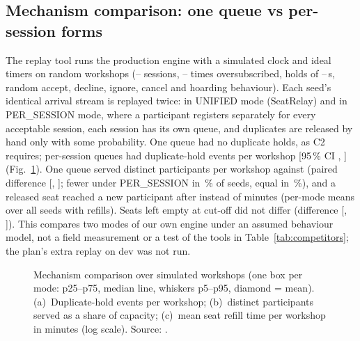 \subsection{Mechanism comparison: one queue vs per-session forms}\label{sec:mechanism}
The replay tool runs the production engine with a simulated clock and ideal timers on
\ReplaySeeds{} random workshops (\ReplayRangeSessionsMin--\ReplayRangeSessionsMax{} sessions,
\ReplayRangeOversubscriptionMin--\ReplayRangeOversubscriptionMax{} times oversubscribed, holds of
\ReplayRangeHoldSecondsMin--\ReplayRangeHoldSecondsMax\,s, random accept, decline, ignore, cancel and
hoarding behaviour). Each seed's identical arrival stream is replayed twice: in UNIFIED mode (SeatRelay) and in
PER\_SESSION mode, where a participant registers separately for every acceptable session, each
session has its own queue, and duplicates are released by hand only with some probability. One queue had
no duplicate holds, as C2 requires; per-session queues had
\ReplayDupHoldEventsPerSessionMean{} duplicate-hold events per workshop
[95\,\% CI \ReplayDupHoldEventsPerSessionLo, \ReplayDupHoldEventsPerSessionHi] (Fig.~\ref{fig:replay}). One
queue served \ReplayDistinctUnifiedMean{} distinct participants per workshop against
\ReplayDistinctPerSessionMean{} (paired difference \ReplayDistinctDeltaMean{}
[\ReplayDistinctDeltaLo, \ReplayDistinctDeltaHi]; fewer under PER\_SESSION in
\ReplayDistinctFewerSeedsPct\,\% of seeds, equal in \ReplayDistinctEqualSeedsPct\,\%), and a released
seat reached a new participant after \ReplayRefillMeanUnifiedMean{} instead of
\ReplayRefillMeanPerSessionMean{} minutes (per-mode means over all seeds with refills). Seats left empty
at cut-off did not differ (difference \ReplaySeatsWastedDeltaMean{}
[\ReplaySeatsWastedDeltaLo, \ReplaySeatsWastedDeltaHi]). This compares two modes of our own engine
under an assumed behaviour model, not a field measurement or a test of the tools in
Table~\ref{tab:competitors}; the plan's extra replay on dev was not run.

\begin{figure}[t]
  \centering{}
  \caption{Mechanism comparison over \ReplaySeeds{} simulated workshops (one box per mode: p25--p75,
  median line, whiskers p5--p95, diamond = mean). (a)~Duplicate-hold events per workshop;
  (b)~distinct participants served as a share of capacity; (c)~mean seat refill time per workshop
  in minutes (log scale). Source: .}
  \label{fig:replay}
\end{figure}

